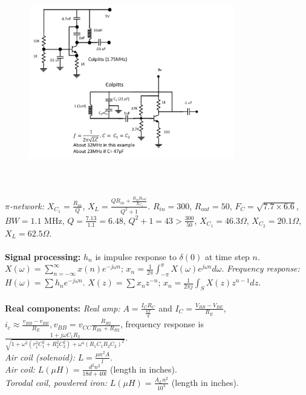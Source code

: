 \begin{figure} 
\center
\includegraphics[width=0.8\textwidth,natwidth=642,natheight=610, height=80mm, width=88mm]{circuit21.pdf}
\end{figure}
\\
$\pi$\emph{-network:} $X_{C_1} = {\frac {R_{in}} {Q}}$,
$X_{L} = {\frac {QR_{in} + {\frac {R_{in}R_{out}} {X_{C_2}}}}
{Q^2+1}}$.
$R_{in} = 300$, $R_{out}= 50$, $F_C= \sqrt{7.7 \times 6.6}$,
$BW= 1.1$ MHz, $Q= {\frac {7.13}{1.1}}=6.48$,
$Q^2+1=43 > {\frac {300} {50}}$,
$X_{C_1} = 46.3 \Omega$,
$X_{C_2} = 20.1 \Omega$,
$X_{L} = 62.5 \Omega$.
\\
\\
{\bf Signal processing:} $h_n$ is impulse response to $\delta(0)$ at time step $n$.
$X( \omega ) = \sum_{n=-\infty}^{\infty} x(n) e^{-j \omega n}$; 
$x_n = {\frac 1 {2 \pi}} \int_{- \pi}^{\pi} X( \omega ) e^{j \omega n} d \omega$.
\emph{Frequency response:} $H( \omega ) = \sum h_n e^{-j \omega n}$.
$X(z)= \sum x_n z^{-n}$; $x_n = {\frac 1 {2 \pi j}} \int_S X(z) z^{n-1} dz$.
\\
\\
{\bf Real components:}
\emph{Real amp:}
$A= {\frac {I_C R_C} {\frac {kT} {q}}}$ and $I_C= {\frac {V_{BB}-V_{BE}} {R_E}}$,
$i_{c} \approx {\frac {v_{BB}-v_{BE}} {R_E}}, v_{BB}= v_{CC} {\frac {R_{B2}} {R_{B1}+R_{B2}}}$,
frequency response is ${\frac {1+j \omega C_1 R_2 }
{\sqrt{1+ \omega^2(r_1^2C_1^2+R_2^2C_2^2)+\omega^4(R_1C_1R_2C_2)^2}}}$.
\\
\emph{Air coil (solenoid):} $L=  {\frac {\mu n^2 A}{l}}$.
\\
\emph{Air coil:} $L(\mu H)= {\frac {d^2 n^2}{18d+40l}}$ (length in inches).
\\
\emph{Torodal coil, powdered iron:} $L(\mu H)= {\frac {A_L n^2}{10^3}}$ (length in inches).
